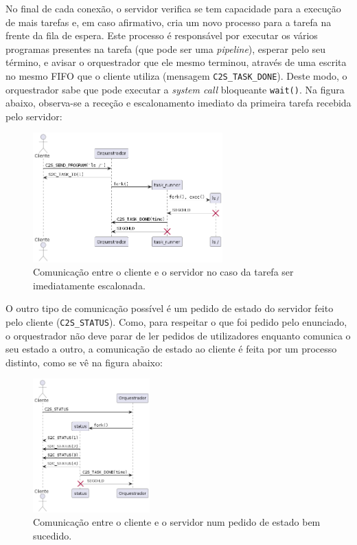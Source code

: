 \documentclass[11pt]{article}
\begin{document}
No final de cada conexão, o servidor verifica se tem capacidade para a execução de mais tarefas e,
em caso afirmativo, cria um novo processo para a tarefa na frente da fila de espera. Este processo é
responsável por executar os vários programas presentes na tarefa (que pode ser uma \emph{pipeline}),
esperar pelo seu término, e avisar o orquestrador que ele mesmo terminou, através de uma escrita no
mesmo FIFO que o cliente utiliza (mensagem \texttt{C2S\_TASK\_DONE}). Deste modo, o orquestrador
sabe que pode executar a \emph{system call} bloqueante \texttt{wait()}. Na figura abaixo, observa-se
a receção e escalonamento imediato da primeira tarefa recebida pelo servidor:

\begin{figure}[H]
    \centering
    \includegraphics[width=0.65\textwidth]{report_figures/CommunicationSchedule.png}
    \caption{Comunicação entre o cliente e o servidor no caso da tarefa ser imediatamente
        escalonada.}
\end{figure}

O outro tipo de comunicação possível é um pedido de estado do servidor feito pelo cliente
(\texttt{C2S\_STATUS}). Como, para respeitar o que foi pedido pelo enunciado, o orquestrador não
deve parar de ler pedidos de utilizadores enquanto comunica o seu estado a outro, a comunicação de
estado ao cliente é feita por um processo distinto, como se vê na figura abaixo:

\begin{figure}[H]
    \centering
    \includegraphics[width=0.4\textwidth]{report_figures/CommunicationStatus.png}
    \caption{Comunicação entre o cliente e o servidor num pedido de estado bem sucedido.}
\end{figure}
\end{document}
